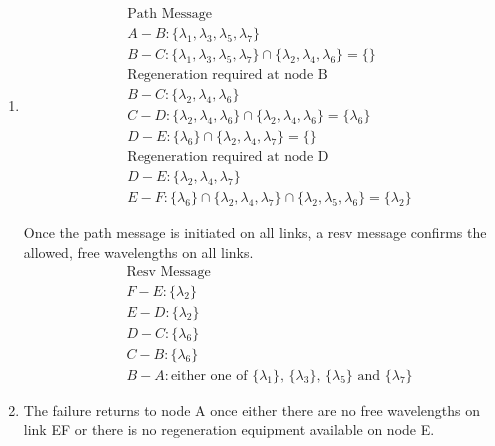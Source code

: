 \documentclass[a4paper]{article}
\begin{document}
\begin{enumerate}[label=\alph*-]
\item
\[
\begin{split}
&\text{Path Message}
\\&
A-B: \{\lambda_1,\lambda_3,\lambda_5,\lambda_7\}
\\&
B-C: \{\lambda_1,\lambda_3,\lambda_5,\lambda_7\}\cap 
\{\lambda_2,\lambda_4,\lambda_6\}=\{\}
\\&\text{Regeneration required at node B}
\\&B-C: \{\lambda_2,\lambda_4,\lambda_6\}
\\&C-D: \{\lambda_2,\lambda_4,\lambda_6\}\cap \{\lambda_2,\lambda_4,\lambda_6\}
=\{\lambda_6\}
\\&D-E: \{\lambda_6\}\cap
\{\lambda_2,\lambda_4,\lambda_7\}
=
\{\}
\\&\text{Regeneration required at node D}
\\&D-E: \{\lambda_2,\lambda_4,\lambda_7\}
\\&E-F: \{\lambda_6\}\cap
\{\lambda_2,\lambda_4,\lambda_7\}
\cap\{\lambda_2,\lambda_5,\lambda_6\}
=\{\lambda_2\}
\end{split}
\]

Once the path message is initiated on all links, a resv message confirms the allowed, free wavelengths on all links.
\[
\begin{split}
&\text{Resv Message}
\\&F-E: \{\lambda_2\}
\\&E-D: \{\lambda_2\}
\\&D-C: \{\lambda_6\}
\\&C-B: \{\lambda_6\}
\\&B-A: \text{either one of $\{\lambda_1\}$, $\{\lambda_3\}$, $\{\lambda_5\}$ and $\{\lambda_7\}$}
\end{split}
\]

\item 
The failure returns to node A once either there are no free wavelengths on link EF or there is no regeneration equipment available on node E.
\end{enumerate}




\end{document}
